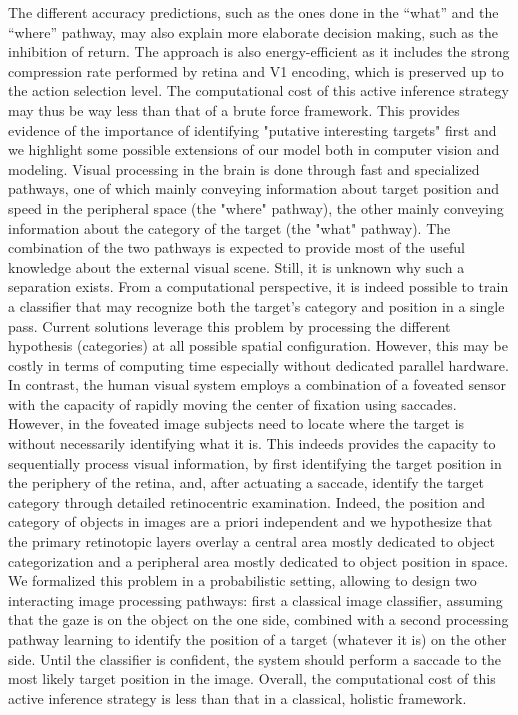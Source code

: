 The different accuracy predictions, such as the ones done in the ``what'' and the ``where'' pathway, may also explain more elaborate decision making, such as the inhibition of return. The approach is also energy-efficient as it includes the strong compression rate performed by retina and V1 encoding, which is preserved up to the action selection level. The computational cost of this active inference strategy may thus be way less than that of a brute force framework. This provides evidence of the importance of identifying "putative interesting targets" first and we highlight some possible extensions of our model both in computer vision and modeling.	
\CNS	
Visual processing in the brain is done through fast and specialized pathways, one of which mainly conveying information about target position and speed in the peripheral space (the "where" pathway), the other mainly conveying  information about the category of the target (the "what" pathway). The combination of the two pathways is expected to provide most of the useful knowledge about the external visual scene. Still, it is unknown why such a separation exists.
From a computational perspective, it is indeed possible to train a classifier that may recognize both the target's category and position in a single  pass. Current solutions leverage this problem by processing the different hypothesis (categories) at all possible spatial configuration. However, this may be costly in terms of computing time especially without dedicated parallel hardware.
In contrast, the human visual system employs a combination of a foveated sensor with the capacity of rapidly moving the center of fixation using saccades. However, in the foveated image subjects need to locate where the target is without necessarily identifying what it is.  This indeeds provides the capacity to sequentially process visual information, by first identifying the target position in the periphery of the retina, and, after actuating a saccade, identify the target category through detailed retinocentric examination. Indeed, the position and category of objects in images are a priori independent and we hypothesize that the primary retinotopic layers overlay a central area mostly dedicated to object categorization and a peripheral area mostly dedicated to object position in space.
We formalized this problem in a probabilistic setting, allowing to design two interacting image processing pathways: first a classical image classifier, assuming that the gaze is  on the object on the one side, combined with a second processing pathway learning to identify the position of a target (whatever it is) on the other side. Until the classifier is confident, the system should perform a saccade to the most likely target position in the image. Overall, the computational cost of this active inference strategy is less than that in a classical, holistic framework.
